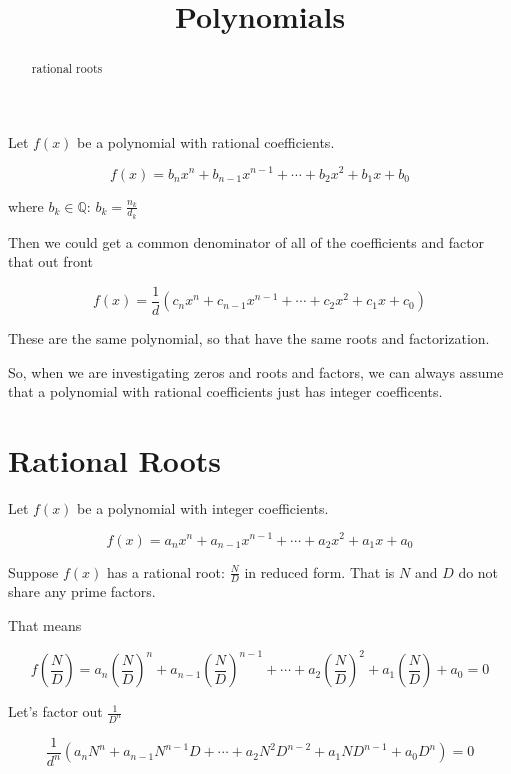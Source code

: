 \documentclass{ximera}
\title{Polynomials}
\begin{document}
\begin{abstract}
rational roots
\end{abstract}
\maketitle




Let $f(x)$ be a polynomial with rational coefficients.

\[   f(x) = b_n x^n + b_{n-1} x^{n-1} + \cdots + b_2 x^2 + b_1 x + b_0     \]


where $b_k \in \mathbb{Q}$:  $b_k = \frac{n_k}{d_k}$


Then we could get a common denominator of all of the coefficients and factor that out front



\[   f(x) = \frac{1}{d}(c_n x^n + c_{n-1} x^{n-1} + \cdots + c_2 x^2 + c_1 x + c_0)    \]


These are the same polynomial, so that have the same roots and factorization.


So, when we are investigating zeros and roots and factors, we can always assume that a polynomial with rational coefficients just has integer coefficents.




\section{Rational Roots}

Let $f(x)$ be a polynomial with integer coefficients.

\[   f(x) = a_n x^n + a_{n-1} x^{n-1} + \cdots + a_2 x^2 + a_1 x + a_0     \]


Suppose $f(x)$ has a rational root:  $\frac{N}{D}$ in reduced form.  That is $N$ and $D$ do not share any prime factors.



That means


\[    f \left( \frac{N}{D} \right) = a_n \left( \frac{N}{D} \right)^n + a_{n-1} \left( \frac{N}{D} \right)^{n-1} + \cdots + a_2 \left( \frac{N}{D} \right)^2 + a_1 \left( \frac{N}{D} \right) + a_0  = 0       \]


Let's factor out $\frac{1}{D^n}$





\[   \frac{1}{d^n} (a_n N^n + a_{n-1} N^{n-1} D + \cdots + a_2 N^2 D^{n-2}+ a_1 N D^{n-1} + a_0 D^n)  = 0       \]
\end{document}
